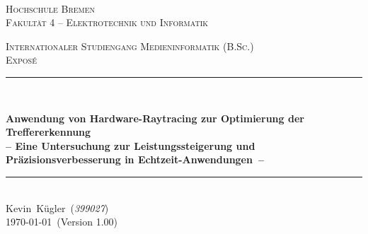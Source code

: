\documentclass[11pt]{scrartcl}
\newcommand{\MetaInstitute}{Hochschule Bremen}
\newcommand{\MetaUnit}{Fakultät 4 -- Elektrotechnik und Informatik}
\newcommand{\MetaTitle}{Anwendung von Hardware-Raytracing zur Optimierung der Treffererkennung}
\newcommand{\MetaSubtitle}{Eine Untersuchung zur Leistungssteigerung und Präzisionsverbesserung in Echtzeit-Anwendungen}
\newcommand{\MetaTask}{Exposé}
\newcommand{\MetaAuthorName}{Kevin}
\newcommand{\MetaAuthorSurname}{Kügler}
\newcommand{\MetaAuthor}{\MetaAuthorName~\MetaAuthorSurname}
\newcommand{\MetaStudentNumber}{\textit{399027}}
\newcommand{\MetaStudyProgram}{Internationaler Studiengang Medieninformatik (B.Sc.)}
\newcommand{\MetaDate}{\germandate\today}
\newcommand{\MetaVersion}{1.00}
\newcommand{\HRule}{\rule{\linewidth}{0.2mm}}	%
\begin{document}
	
	\begin{titlepage}
		\shortdate %
		\center %
		
		~\\[1cm]
		
		
		\begin{figure}[h!]
			\centering
		\end{figure}
		
		\vspace{-0.5cm}
		\textsc{\Large \MetaInstitute}\\[0.2cm] %
		\textsc{\Large \MetaUnit}%
		
		\textsc{\large \MetaStudyProgram}\\[1.5cm]
		
		\textsc{\LARGE \MetaTask}\\[1.5cm] %
		
		\HRule \\[0.5cm]
		{
			\LARGE \bfseries \MetaTitle \\[0.50cm] %
			\LARGE \bfseries -- \MetaSubtitle\ -- \\[0.50cm] %
			\par
		}
		\HRule \\[1.5cm]
		
		\large 
		\MetaAuthor\ (\MetaStudentNumber)\\
		
		\vspace*{\fill}
		{
			\large \MetaDate\ (Version \MetaVersion)
		}
	\end{titlepage}
\end{document}

